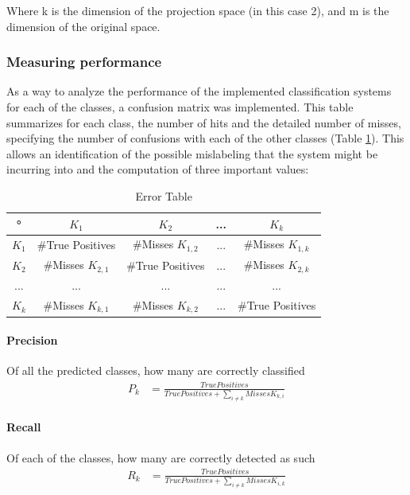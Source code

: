 \documentclass{IEEEtran}
\begin{document}
Where k is the dimension of the projection space (in this case 2), and m is the dimension of the original space.

\subsubsection{Measuring performance}
\label{sub:measures}
As a way to analyze the performance of the implemented classification systems for each of the classes, 
a confusion matrix was implemented. 
This table summarizes for each class, the number of hits and the detailed number of misses, specifying 
the number of confusions with each of the other classes (Table \ref{tb:tbError}).
This allows an identification of the possible mislabeling that the system might be incurring into and
the computation of three important values:

\begin{table}
\centering
\begin{tabular}{|c | c | c| c| c|}
\hline
° &  $K_{1}$ &  $K_{2}$  & ... & $K_{k}$ \\
\hline
 $K_{1}$  & \#True Positives & \#Misses $K_{1,2}$ & ... & \#Misses $K_{1,k}$  \\
\hline
 $K_{2}$  & \#Misses $K_{2,1}$ & \#True Positives &  ... & \#Misses $K_{2,k}$  \\
\hline
... & ... & ... & ... & ... \\
\hline
 $K_{k}$  & \#Misses $K_{k,1}$ & \#Misses $K_{k,2}$ & ... & \#True Positives   \\
\hline
\end{tabular}
\caption{Error Table}
\label{tb:tbError}
\end{table}
 
\paragraph{Precision}  
Of all the predicted classes, how many are correctly classified 
\begin{align}
P_k &= \frac{True Positives}{True Positives + \sum_{i \ne k}{Misses K_{k,i}}} \label{eq:precision} 
\end{align}
\paragraph{Recall} 
Of each of the classes, how many are correctly detected as such 
\begin{align}
R_k &= \frac{True Positives}{True Positives + \sum_{i \ne k}{Misses K_{i,k}}} \label{eq:recall}
\end{align}
\end{document}
